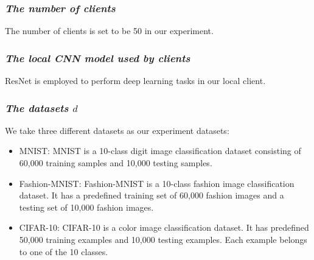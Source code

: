 \documentclass[journal]{IEEEtran}
\begin{document}
  \subsubsection{{\textit{The number of clients}}} The number of clients is set to be 50 in our experiment.
  \subsubsection{{\textit{The local CNN model used by clients}}} ResNet is employed to perform deep learning tasks in our local client.
  \subsubsection{{\textit{The datasets {$d$}}}} We take three different datasets as our experiment datasets: \begin{itemize}
      \item MNIST: MNIST is a 10-class digit image classification dataset consisting of 60,000 training samples and 10,000 testing samples.
      \item Fashion-MNIST: Fashion-MNIST is a 10-class fashion image classification dataset. It has a predefined training set of 60,000 fashion images and a testing set of 10,000 fashion images.
      \item CIFAR-10: CIFAR-10 is a color image classification dataset. It has predefined 50,000 training examples and 10,000 testing examples. Each example belongs to one of the 10 classes.
  \end{itemize} 
\end{document}
